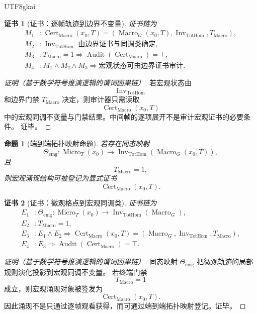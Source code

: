 \documentclass[12pt]{article}
\newtheorem{proposition}{命题}[section]
\newtheorem{Certificate}{证书}[section]
\DeclareMathOperator{\Cert}{Cert}
\DeclareMathOperator{\Audit}{Audit}
\DeclareMathOperator{\Inv}{Inv}
\DeclareMathOperator{\TotHom}{TotHom}
\DeclareMathOperator{\Macro}{Macro}
\DeclareMathOperator{\Micro}{Micro}
\begin{document}
\begin{CJK*}{UTF8}{gkai}
\begin{Certificate}[证书：逐帧轨迹到边界不变量]
\label{cert:tex59-macro-invariant-skip}
证书链为
\[
\begin{aligned}
  M_1 &: \Cert_{\Macro}(x_0,T)
       =
       (\Macro_G(x_0,T),\Inv_{\TotHom},T_{\Macro}),\\
  M_2 &: \Inv_{\TotHom}\text{ 由边界证书与同调类确定},\\
  M_3 &: T_{\Macro}=1\Rightarrow \Audit(\Cert_{\Macro})=\top,\\
  M_4 &: M_1\wedge M_2\wedge M_3
       \Rightarrow \text{宏观状态可由边界证书审计}.
\end{aligned}
\]
\end{Certificate}

\begin{proof}[证明（基于数学符号推演逻辑的谓词因果链）]
若宏观状态由
\[
  \Inv_{\TotHom}
\]
和边界门禁 \(T_{\Macro}\) 决定，则审计器只需读取
\[
  \Cert_{\Macro}(x_0,T)
\]
中的宏观同调不变量与门禁结果。中间帧的逐项展开不是审计宏观证书的必要条件。
证毕。
\end{proof}

\begin{proposition}[端到端拓扑映射命题]
\label{prop:tex59-emergence-hom-map}
若存在同态映射
\[
  \Theta_{\mathrm{emg}}:
  \Micro_T(x_0)
  \longrightarrow
  \Inv_{\TotHom}(\Macro_G(x_0,T)),
\]
且
\[
  T_{\Macro}=1,
\]
则宏观涌现结构可被登记为显式证书
\[
  \Cert_{\Macro}(x_0,T).
\]
\end{proposition}

\begin{Certificate}[证书：微观格点到宏观同调类]
\label{cert:tex59-emergence-hom-map}
证书链为
\[
\begin{aligned}
  E_1 &: \Theta_{\mathrm{emg}}:
       \Micro_T(x_0)\to\Inv_{\TotHom}(\Macro_G),\\
  E_2 &: T_{\Macro}=1,\\
  E_3 &: E_1\wedge E_2
       \Rightarrow
       \Cert_{\Macro}(x_0,T)
       =
       (\Macro_G,\Inv_{\TotHom},T_{\Macro}),\\
  E_4 &: E_3\Rightarrow \Audit(\Cert_{\Macro})=\top.
\end{aligned}
\]
\end{Certificate}

\begin{proof}[证明（基于数学符号推演逻辑的谓词因果链）]
同态映射 \(\Theta_{\mathrm{emg}}\) 把微观轨迹的局部规则演化投影到宏观同调不变量。
若终端门禁
\[
  T_{\Macro}=1
\]
成立，则宏观涌现对象被签发为
\[
  \Cert_{\Macro}(x_0,T).
\]
因此涌现不是只通过逐帧观看获得，而可通过端到端拓扑映射登记。证毕。
\end{proof}


\end{CJK*}
\end{document}
